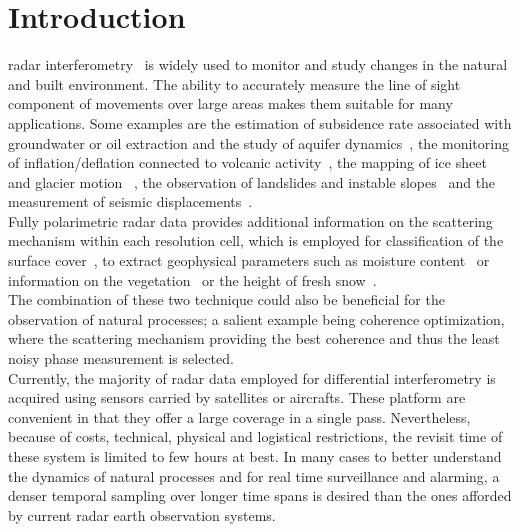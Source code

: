 \section{Introduction}
 radar interferometry~\cite{Gabriel1989, Massonnet1993,Rosen2000,Bamler1999} is widely used  to monitor and study changes in the natural and built environment. The ability to accurately measure the line of sight component  of movements over large areas makes them suitable for many  applications. Some examples are the estimation of subsidence rate associated with groundwater or oil extraction and the study of aquifer dynamics~\cite{Galloway1998, Strozzi2001,Galloway2007}, the monitoring of inflation/deflation connected to volcanic activity~\cite{Massonnet1995}, the mapping of ice sheet and glacier motion~\cite{Goldstein1993,Mohr1998} , the observation of landslides and instable slopes~\cite{Carnec1996,Catani2005} and the measurement of seismic displacements~\cite{Massonnet1993a,Zebker1994}.\\
Fully polarimetric radar data provides additional information on the scattering mechanism within each resolution cell, which is employed for classification of the surface cover~\cite{Cloude1997, Lee1999}, to extract geophysical parameters such as moisture content~\cite{Hajnsek2003} or information on the vegetation~\cite{Ulaby1987} or the height of fresh snow~\cite{Leinss2014}.\\
The combination of these two technique could also be beneficial for the observation of natural processes; a salient example being coherence optimization, where the scattering mechanism providing the best coherence and thus the least noisy phase measurement is selected\cite{Pipia2009a, Iglesias2014b}.\\
Currently, the majority of radar data employed for differential interferometry is acquired using sensors carried by satellites or aircrafts. These platform are convenient in that they offer a large coverage in a single pass. Nevertheless, because of costs, technical, physical and logistical restrictions, the revisit time of these system is limited to few hours at best. 
In many cases to better understand the dynamics of natural processes and for real time surveillance and alarming, a denser temporal sampling over longer time spans is desired than the ones afforded by current radar earth observation systems.
